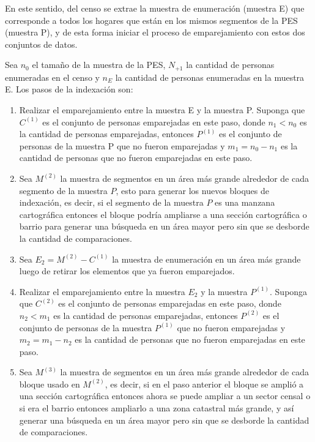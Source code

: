 \documentclass[
  12pt,
]{book}
\providecommand{\tightlist}{%
  \setlength{\itemsep}{0pt}\setlength{\parskip}{0pt}}
\begin{document}
En este sentido, del censo se extrae la muestra de enumeración (muestra E) que corresponde a todos los hogares que están en los mismos segmentos de la PES (muestra P), y de esta forma iniciar el proceso de emparejamiento con estos dos conjuntos de datos.

Sea \(n_0\) el tamaño de la muestra de la PES, \(N_{+1}\) la cantidad de personas enumeradas en el censo y \(n_E\) la cantidad de personas enumeradas en la muestra E. Los pasos de la indexación son:

\begin{enumerate}
\def\labelenumi{\arabic{enumi}.}
\tightlist
\item
  Realizar el emparejamiento entre la muestra E y la muestra P. Suponga que \(C^{(1)}\) es el conjunto de personas emparejadas en este paso, donde \(n_1<n_0\) es la cantidad de personas emparejadas, entonces \(P^{(1)}\) es el conjunto de personas de la muestra P que no fueron emparejadas y \(m_1 = n_0 - n_1\) es la cantidad de personas que no fueron emparejadas en este paso.
\item
  Sea \(M^{(2)}\) la muestra de segmentos en un área más grande alrededor de cada segmento de la muestra \(P\), esto para generar los nuevos bloques de indexación, es decir, si el segmento de la muestra \(P\) es una manzana cartográfica entonces el bloque podría ampliarse a una sección cartográfica o barrio para generar una búsqueda en un área mayor pero sin que se desborde la cantidad de comparaciones.
\item
  Sea \(E_2 = M^{(2)} - C^{(1)}\) la muestra de enumeración en un área más grande luego de retirar los elementos que ya fueron emparejados.
\item
  Realizar el emparejamiento entre la muestra \(E_2\) y la muestra \(P^{(1)}\). Suponga que \(C^{(2)}\) es el conjunto de personas emparejadas en este paso, donde \(n_2<m_1\) es la cantidad de personas emparejadas, entonces \(P^{(2)}\) es el conjunto de personas de la muestra \(P^{(1)}\) que no fueron emparejadas y \(m_2 = m_1 - n_2\) es la cantidad de personas que no fueron emparejadas en este paso.
\item
  Sea \(M^{(3)}\) la muestra de segmentos en un área más grande alrededor de cada bloque usado en \(M^{(2)}\), es decir, si en el paso anterior el bloque se amplió a una sección cartográfica entonces ahora se puede ampliar a un sector censal o si era el barrio entonces ampliarlo a una zona catastral más grande, y así generar una búsqueda en un área mayor pero sin que se desborde la cantidad de comparaciones.

\end{enumerate}
\end{document}
